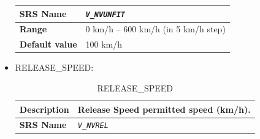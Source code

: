 \documentclass{template/openetcs}
\begin{document}
\begin{itemize}
\begin{longtable}{|l|l|}
				\hline
				
					\begin{minipage}[t]{0.22\linewidth} \textbf{SRS Name}	\end{minipage} 
				&	\begin{minipage}[t]{0.78\linewidth} \emph{\texttt{V\_NVUNFIT}} \end{minipage} \\
				
				\hline
														
					\begin{minipage}[t]{0.22\linewidth} \textbf{Range}	\end{minipage} 
				&	\begin{minipage}[t]{0.78\linewidth} 0 km/h – 600 km/h (in 5 km/h step) \end{minipage} \\
				
				\hline
										
					\begin{minipage}[t]{0.22\linewidth} \textbf{Default value}	\end{minipage} 
				&	\begin{minipage}[t]{0.78\linewidth} 100 km/h \end{minipage} \\
				
				\hline
				
			\end{longtable}
						
			
			
		\item RELEASE\_SPEED:
		
			\begin{longtable}{|l|l|}
				\caption{RELEASE\_SPEED}\\ 												
				\hline
				
					\begin{minipage}[t]{0.22\linewidth} \textbf{Description}	\end{minipage} 
				&	\begin{minipage}[t]{0.78\linewidth} Release Speed permitted speed (km/h). \end{minipage} \\
				
				\hline
				
					\begin{minipage}[t]{0.22\linewidth} \textbf{SRS Name}	\end{minipage} 
				&	\begin{minipage}[t]{0.78\linewidth} \emph{\texttt{V\_NVREL}} \end{minipage} \\
				

\end{longtable}
\end{itemize}
\end{document}
